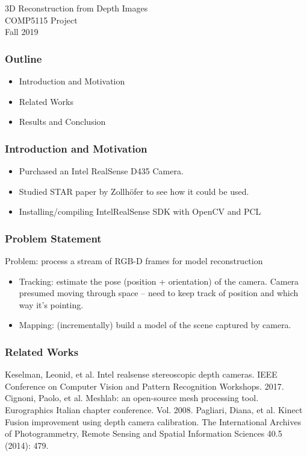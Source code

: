 \begin{frame}
\begin{center}
{\Large
3D Reconstruction from Depth Images\\
COMP5115 Project \\
Fall 2019 }
\end{center}
\end{frame}

\begin{frame}
\frametitle{Outline}
\begin{itemize}
\item Introduction and Motivation
\item Related Works
\item Results and Conclusion
\end{itemize}
\end{frame}

\begin{frame}
\frametitle{Introduction and Motivation}
\begin{itemize}
\item Purchased an Intel RealSense D435 Camera.
\item Studied STAR paper by Zollh\"ofer to see how it could be used.
\item Installing/compiling IntelRealSense SDK with OpenCV and PCL
\end{itemize}

\end{frame}

\begin{frame}
\frametitle{Problem Statement}
Problem: process a stream of RGB-D frames for model reconstruction
\begin{itemize}
  \item Tracking: estimate the pose (position + orientation) of the camera.
  Camera presumed moving through space -- need to keep track of position and which way it's pointing.
  \item Mapping: (incrementally) build a model of the scene captured by camera.
\end{itemize}
\end{frame}


\begin{frame}[allowframebreaks]
  \frametitle<presentation>{Related Works}
  \begin{thebibliography}{1}
  \beamertemplatearticlebibitems
  \newblock Keselman, Leonid, et al.
  \newblock Intel realsense stereoscopic depth cameras.
  \newblock IEEE Conference on Computer Vision and Pattern Recognition Workshops. 2017.
  \newblock Cignoni, Paolo, et al.
  \newblock Meshlab: an open-source mesh processing tool.
  \newblock Eurographics Italian chapter conference. Vol. 2008.
  \newblock Pagliari, Diana, et al.
  \newblock Kinect Fusion improvement using depth camera calibration.
  \newblock The International Archives of Photogrammetry, Remote Sensing and Spatial Information Sciences 40.5 (2014): 479.
\end{thebibliography}
\end{frame}
